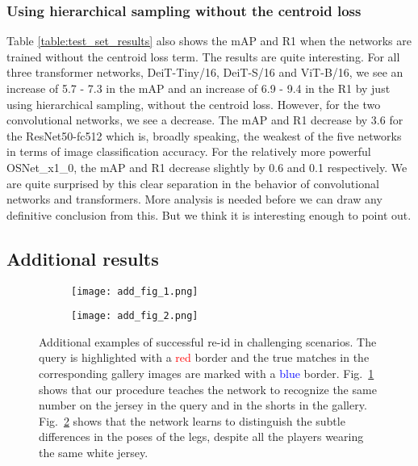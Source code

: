 \documentclass{article}
\begin{document}
\subsubsection{Using hierarchical sampling without the centroid loss}

Table \ref{table:test_set_results} also shows the mAP and R1 when the networks are trained without the centroid loss term. The results are quite interesting. For all three transformer networks, DeiT-Tiny/16, DeiT-S/16 and ViT-B/16, we see an increase of 5.7 - 7.3 in the mAP and an increase of 6.9 - 9.4 in the R1 by just using hierarchical sampling, without the centroid loss. However, for the two convolutional networks, we see a decrease. The mAP and R1 decrease by 3.6 for the ResNet50-fc512 which is, broadly speaking, the weakest of the five networks in terms of image classification accuracy. For the relatively more powerful OSNet\_x1\_0, the mAP and R1 decrease slightly by 0.6 and 0.1 respectively. We are quite surprised by this clear separation in the behavior of convolutional networks and transformers. More analysis is needed before we can draw any definitive conclusion from this. But we think it is interesting enough to point out.





    












\subsection{Additional results}

\begin{figure}[!ht]
\begin{subfigure}{0.48\textwidth}
         \centering
         \texttt{[image: add\_fig\_1.png]}
         \caption{}
         \label{fig:add_a}
     \end{subfigure}
     \hfill
    \begin{subfigure}{0.48\textwidth}
        \centering
        \texttt{[image: add\_fig\_2.png]}
        \caption{}
        \label{fig:add_b}
    \end{subfigure}
\caption{Additional examples of successful re-id in challenging scenarios. The query is highlighted with a \textcolor{red}{red} border and the true matches in the corresponding gallery images are marked with a \textcolor{blue}{blue} border. Fig.~\ref{fig:add_a} shows that our procedure teaches the network to recognize the same number on the jersey in the query and in the shorts in the gallery. Fig.~\ref{fig:add_b} shows that the network learns to distinguish the subtle differences in the poses of the legs, despite all the players wearing the same white jersey. 
}
    \label{fig:addfigures}
\end{figure}
\end{document}
